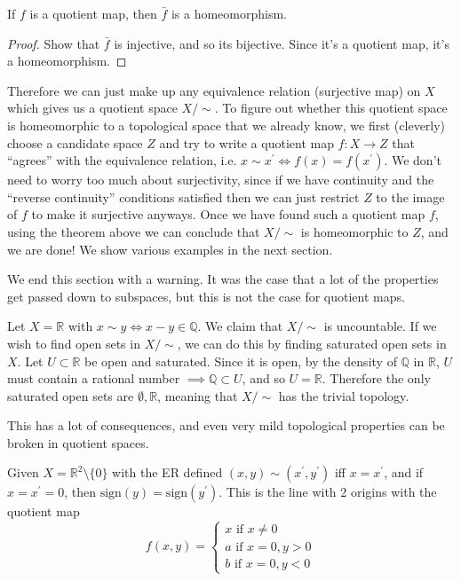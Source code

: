     \begin{corollary}
      If $f$ is a quotient map, then $\bar{f}$ is a homeomorphism. 
    \end{corollary}
    \begin{proof}
      Show that $\bar{f}$ is injective, and so its bijective. Since it's a quotient map, it's a homeomorphism. 
    \end{proof}

    Therefore we can just make up any equivalence relation (surjective map) on $X$ which gives us a quotient space $X/{\sim}$. To figure out whether this quotient space is homeomorphic to a topological space that we already know, we first (cleverly) choose a candidate space $Z$ and try to write a quotient map $f: X \rightarrow Z$ that ``agrees'' with the equivalence relation, i.e. $x \sim x^\prime \iff f(x) = f(x^\prime)$. We don't need to worry too much about surjectivity, since if we have continuity and the ``reverse continuity'' conditions satisfied then we can just restrict $Z$ to the image of $f$ to make it surjective anyways. Once we have found such a quotient map $f$, using the theorem above we can conclude that $X/{\sim}$ is homeomorphic to $Z$, and we are done! We show various examples in the next section. 

    We end this section with a warning. It was the case that a lot of the properties get passed down to subspaces, but this is not the case for quotient maps. 

    \begin{example}
      Let $X = \mathbb{R}$ with $x \sim y \iff x - y \in \mathbb{Q}$. We claim that $X/{\sim}$ is uncountable. If we wish to find open sets in $X/{\sim}$, we can do this by finding saturated open sets in $X$. Let $U \subset \mathbb{R}$ be open and saturated. Since it is open, by the density of $\mathbb{Q}$ in $\mathbb{R}$, $U$ must contain a rational number $\implies \mathbb{Q} \subset U$, and so $U = \mathbb{R}$. Therefore the only saturated open sets are $\emptyset, \mathbb{R}$, meaning that $X/{\sim}$ has the trivial topology. 
    \end{example}

    This has a lot of consequences, and even very mild topological properties can be broken in quotient spaces.  

    \begin{example}
      Given $X = \mathbb{R}^2 \setminus \{0\}$ with the ER defined $(x, y) \sim (x^\prime, y^\prime)$ iff $x = x^\prime$, and if $x = x^\prime = 0$, then $\mathrm{sign}(y) = \mathrm{sign}(y^\prime)$. This is the line with 2 origins with the quotient map 
      \begin{equation}
        f(x, y) = \begin{cases} 
          x \text{ if } x \neq 0 \\
          a \text{ if } x = 0, y > 0 \\ 
          b \text{ if } x = 0, y < 0
        \end{cases}
      \end{equation}
    \end{example}

